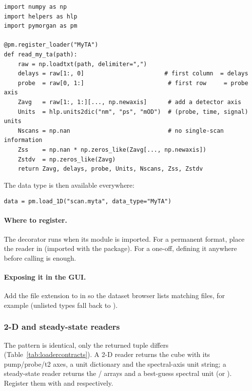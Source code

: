 \begin{lstlisting}
import numpy as np
import helpers as hlp
import pymorgan as pm

@pm.register_loader("MyTA")
def read_my_ta(path):
    raw = np.loadtxt(path, delimiter=",")
    delays = raw[1:, 0]                       # first column  = delays
    probe  = raw[0, 1:]                        # first row     = probe axis
    Zavg   = raw[1:, 1:][..., np.newaxis]      # add a detector axis
    Units  = hlp.units2dic("nm", "ps", "mOD")  # (probe, time, signal) units
    Nscans = np.nan                            # no single-scan information
    Zss    = np.nan * np.zeros_like(Zavg[..., np.newaxis])
    Zstdv  = np.zeros_like(Zavg)
    return Zavg, delays, probe, Units, Nscans, Zss, Zstdv
\end{lstlisting}

The data type is then available everywhere:

\begin{lstlisting}
data = pm.load_1D("scan.myta", data_type="MyTA")
\end{lstlisting}

\paragraph{Where to register.}
The decorator runs when its module is imported. For a permanent format, place the
reader in  (imported with the package). For a one-off,
defining it anywhere before calling  is enough.

\paragraph{Exposing it in the GUI.}
Add the file extension to  in
 so the dataset browser lists matching files,
for example  (unlisted types fall back to ).

\subsubsection{2-D and steady-state readers}
The pattern is identical, only the returned tuple differs
(Table~\ref{tab:loadercontracts}). A 2-D reader returns the cube
 with its pump/probe/t2 axes, a unit dictionary and the
spectral-axis unit string; a steady-state reader returns the /
arrays and a best-guess spectral unit (or ). Register them with
 and
 respectively.

